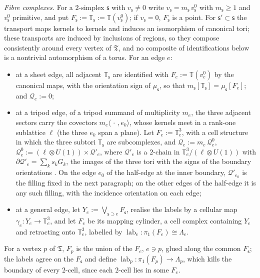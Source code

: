 \emph{Fibre complexes.} For a $2$-simplex $\mathsf s$ with $v_{\mathsf s}\ne0$ write $v_{\mathsf s}=m_{\mathsf s}\,v^0_{\mathsf s}$ with $m_{\mathsf s}\ge1$ and $v^0_{\mathsf s}$
primitive, and put $F_{\mathsf s}:=\mathbb T_{\mathsf s}:=\mathbb T(v^0_{\mathsf s})$; if $v_{\mathsf s}=0$, $F_{\mathsf s}$ is a point. For $\mathsf s'\subset \mathsf s$ the transport maps
kernels to kernels and induces an isomorphism of canonical tori; these transports are induced by inclusions of regions, so
they compose consistently around every vertex of $\mathfrak T$, and no composite of identifications below is a nontrivial
automorphism of a torus. For an edge $e$:
\begin{itemize}
\item at a sheet edge, all adjacent $\mathbb T_{\mathsf s}$ are identified with $F_e:=\mathbb T(v^0_e)$ by the canonical maps, with the
orientation sign of $\mu_{\mathsf s}$, so that $m_{\mathsf s}[\mathbb T_{\mathsf s}]=\mu_{\mathsf s}[F_e]$; and $\mathscr Q_e:=0$;
\item at a tripod edge, of a tripod summand of multiplicity $m_e$, the three adjacent sectors carry the covectors
$m_e\langle\,\cdot\,,e_k\rangle$, whose kernels meet in a rank-one sublattice $\ell$ (the three $e_k$ span a plane). Let
$F_e:=\mathbb T^3_e$, with a cell structure in which the three subtori $\mathbb T_{\mathsf s}$ are subcomplexes, and
$\mathscr Q_e:=m_e\,\mathscr Q_e^0$, $\mathscr Q_e^0:=(\ell\otimes U(1))\times\mathcal Q'_e$, where $\mathcal Q'_e$ is a $2$-chain in
$\mathbb T^3_e/(\ell\otimes U(1))$ with $\partial\mathcal Q'_e=\sum_ks_kG_k$, the images of the three tori with the signs of the
boundary orientations \cite[\S7.7, Step~2]{CBM}. On the edge $e_0$ of the half-edge at the inner boundary, $\mathcal Q'_{e_0}$
is the filling fixed in the next paragraph; on the other edges of the half-edge it is any such filling, with the incidence
orientation on each edge;
\item at a general edge, let $Y_e:=\bigvee_{\mathsf s\supset e}F_{\mathsf s}$, realise the labels by a cellular map $\gamma_e\colon Y_e\to\mathbb T^3_e$,
and let $F_e$ be its mapping cylinder, a cell complex containing $Y_e$ and retracting onto $\mathbb T^3_e$, labelled by
$\operatorname{lab}_e\colon\pi_1(F_e)\cong\Lambda_e$.
\end{itemize}
For a vertex $p$ of $\mathfrak T$, $F_p$ is the union of the $F_e$, $e\ni p$, glued along the common $F_{\mathsf s}$; the labels agree on
the $F_{\mathsf s}$ and define $\operatorname{lab}_p\colon\pi_1(F_p)\to\Lambda_p$, which kills the boundary of every $2$-cell, since each $2$-cell
lies in some $F_e$.

